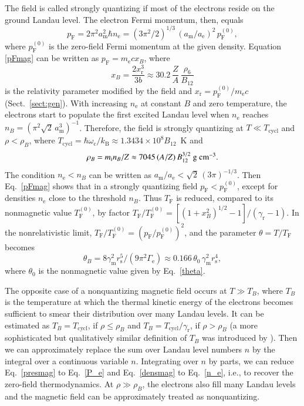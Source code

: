 \documentclass[traditabstract]{aa}
\newcommand{\beq}{\begin{equation}}
\newcommand{\eeq}{\end{equation}}
\newcommand{\req}[1]{Eq.~\ref{#1}}
\newcommand{\ael}{a_\mathrm{e}}
\newcommand{\am}{a_\mathrm{m}}
\newcommand{\Gamme}{\Gamma_\mathrm{e}}
\newcommand{\gammam}{\gamma_\mathrm{m}}
\newcommand{\gcc}{\mbox{g~cm$^{-3}$}}
\newcommand{\gr}{\gamma_\mathrm{r}}
\newcommand{\mel}{m_\mathrm{e}}
\newcommand{\mion}{m_\mathrm{i}}
\newcommand{\nel}{n_\mathrm{e}}
\newcommand{\kB}{k_\mathrm{B}}
\newcommand{\omc}{\omega_\mathrm{c}}
\newcommand{\pF}{p_\mathrm{F}}
\newcommand{\rs}{r_\mathrm{s}}
\newcommand{\TF}{T_\mathrm{F}}
\newcommand{\xr}{x_\mathrm{r}}
\begin{document}
The field is called strongly quantizing if most of the
electrons reside on the ground Landau level. The
electron Fermi momentum, then, equals
\beq
  \pF = 2\pi^2\am^2\hbar \nel
    = (3\pi^2/2)^{1/3}\,(\am/\ael)^2\,\pF^{(0)},
\label{pFmag}
\eeq
where $\pF^{(0)}$ is the zero-field
Fermi momentum at the given density.
Equation \ref{pFmag} can be written as
$\pF =\mel c x_B$, where
\beq
   x_B = \frac{2\xr^3}{3b}
        \approx 30.2\,\frac{{Z}}{A}
               \,\frac{\rho_6}{ B_{12}}
\label{pF-mag}
\end{equation}
%
is the relativity parameter modified by the field and
$\xr=\pF^{(0)}/\mel c$ (Sect.~\ref{sect:gen}).
With increasing $\nel$ at constant $B$ and zero temperature,
the electrons start to populate the first excited Landau
level when $\nel$ reaches $n_B=(\pi^2\sqrt2\,\am^3)^{-1}$.
Therefore, the field is strongly quantizing at 
$T\ll T_\mathrm{cycl}$ and $\rho<\rho_B$, where
$
    T_\mathrm{cycl} = \hbar\omc/\kB
      \approx 1.3434\times10^8 B_{12}
$~K
and
\beq
    \rho_B = \mion n_B/Z
  \approx 7045 \,(A/Z)
       \,B_{12}^{3/2}\mbox{ \gcc}.
\label{rho_B}
\eeq
The condition $\nel<n_B$ can be written as $\am/\ael <
\sqrt2\,(3\pi)^{-1/3}$. Then \req{pFmag} shows that in a
strongly quantizing field $\pF < \pF^{(0)}$, except for
densities $\nel$ close to the threshold $n_B$. Thus $\TF$ is
reduced, compared to its nonmagnetic value $\TF^{(0)}$, by
factor $\TF/\TF^{(0)}=[(1+x_B^2)^{1/2}-1]/(\gr-1)$. In the
nonrelativistic limit,  $\TF/\TF^{(0)} = (\pF/\pF^{(0)})^2$,
and the parameter $\theta=T/\TF$ becomes
\beq
   \theta_B=8\gammam^2
       \rs^5/(9\pi^2\Gamme)
        \approx 0.166\,\theta_0\,\gammam^2 \rs^4,
\label{theta_B}
\eeq
where $\theta_0$ is the nonmagnetic value given by \req{theta}.

The opposite case of a nonquantizing magnetic field occurs
at $T\gg T_B$, where $T_B$ is the temperature at which the
thermal kinetic energy of the electrons becomes sufficient
to smear their distribution over many Landau levels. It can
be estimated as $T_B = T_\mathrm{cycl}$, if $\rho \leq
\rho_B$ and $T_B=T_\mathrm{cycl}/\gr$, if $\rho > \rho_B$
(a more sophisticated but qualitatively similar definition
of $T_B$ was introduced by \citealp{Lai01}).
Then we can approximately replace the sum over Landau level
numbers $n$  by the integral over a continuous variable $n$.
Integrating over $n$ by parts, we can reduce \req{presmag}
to \req{P_e} and \req{densmag} to \req{n_e}, i.e., to
recover the zero-field thermodynamics. At $\rho\gg\rho_B$,
the electrons also fill many Landau levels and the magnetic
field can be approximately treated as nonquantizing.
\end{document}
